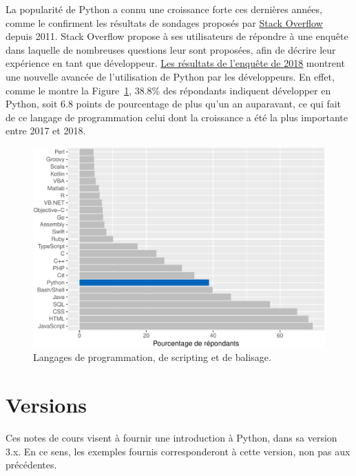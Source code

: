 \documentclass[12pt,]{book}
\numberwithin{equation}{section}
\numberwithin{countremarque}{section}
\begin{document}
La popularité de Python a connu une croissance forte ces dernières
années, comme le confirment les résultats de sondages proposés par
\href{https://stackoverflow.com/}{Stack Overflow} depuis 2011. Stack
Overflow propose à ses utilisateurs de répondre à une enquête dans
laquelle de nombreuses questions leur sont proposées, afin de décrire
leur expérience en tant que développeur.
\href{https://insights.stackoverflow.com/survey/2018\#technology}{Les
résultats de l'enquête de 2018} montrent une nouvelle avancée de
l'utilisation de Python par les développeurs. En effet, comme le montre
la Figure~\ref{fig:intro-stack-langages}, 38.8\% des répondants
indiquent développer en Python, soit 6.8 points de pourcentage de plus
qu'un an auparavant, ce qui fait de ce langage de programmation celui
dont la croissance a été la plus importante entre 2017 et 2018.

\begin{figure}

{\centering \includegraphics{_main_files/figure-latex/intro-stack-langages-1} 

}

\caption{Langages de programmation, de scripting et de balisage.}\label{fig:intro-stack-langages}
\end{figure}

\section{Versions}\label{versions}

Ces notes de cours visent à fournir une introduction à Python, dans sa
version 3.x. En ce sens, les exemples fournis corresponderont à cette
version, non pas aux précédentes.
\end{document}
